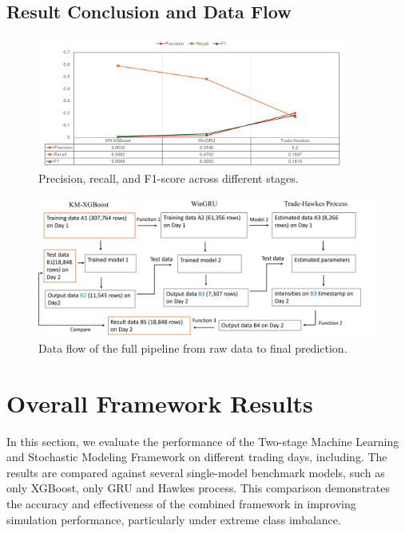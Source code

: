 \subsection{Result Conclusion and Data Flow}
\begin{figure}[H]
    \centering
    \includegraphics[width=0.9\textwidth]{figures/final_performance_plot.png}
    \caption{Precision, recall, and F1-score across different stages.}
    \label{fig:final-performance}
\end{figure}

\begin{figure}[H]
    \centering
    \includegraphics[width=\textwidth]{figures/data flow.png}
    \caption{Data flow of the full pipeline from raw data to final prediction.}
    \label{fig:data-flow-diagram}
\end{figure}

\section{Overall Framework Results}
In this section, we evaluate the performance of the Two-stage Machine Learning and Stochastic Modeling Framework on different trading days, including. The results are compared against several single-model benchmark models, such as only XGBoost, only GRU and Hawkes process. This comparison demonstrates the accuracy and effectiveness of the combined framework in improving simulation performance, particularly under extreme class imbalance.













